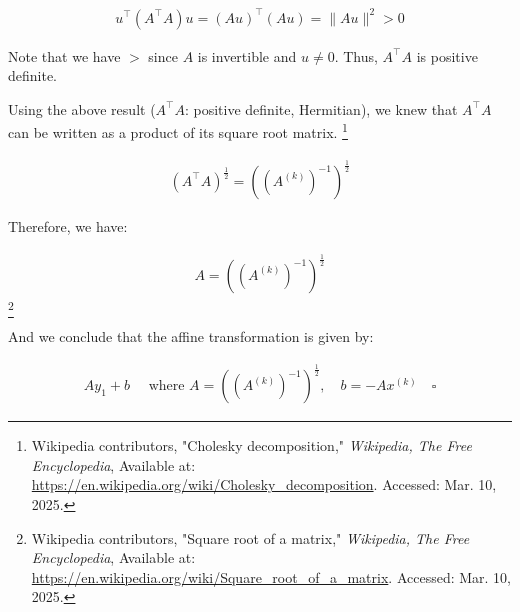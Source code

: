 \documentclass{article}
\begin{document}
\begin{align*}
    u^\intercal (A^\intercal A) u = (A u)^\intercal (A u)  = \|A u\|^2 > 0
\end{align*}

Note that we have $>$ since $A$ is invertible and $u \ne 0$.
Thus, $A^\intercal A$ is positive definite.
\bigskip

Using the above result ($A^\intercal A$: positive definite, Hermitian),
we knew that $A^\intercal A$ can be written as a product of its square root matrix.
\footnote{Wikipedia contributors, "Cholesky decomposition," \textit{Wikipedia, The Free Encyclopedia}, Available at: \url{https://en.wikipedia.org/wiki/Cholesky_decomposition}. Accessed: Mar. 10, 2025.}

\begin{align*}
    (A^\intercal A)^{\frac{1}{2}} = ((A^{(k)})^{-1})^{\frac{1}{2}}
\end{align*}

Therefore, we have:

\begin{align*}
    A = ((A^{(k)})^{-1})^{\frac{1}{2}}
\end{align*}
\footnote{Wikipedia contributors, "Square root of a matrix," \textit{Wikipedia, The Free Encyclopedia}, Available at: \url{https://en.wikipedia.org/wiki/Square_root_of_a_matrix}. Accessed: Mar. 10, 2025.}

And we conclude that the affine transformation is given by:

\begin{align*}
    A y_1 + b \quad \text{ where }
    A = ((A^{(k)})^{-1})^{\frac{1}{2}}, \quad b = -A x^{(k)} \quad \square
\end{align*}



\begin{comment}
\begin{align*}
    y_1 = A^{-1}(y_1' - b) 
\end{align*}

since $A$ is guaranteed to be invertible by the definition of affine transformation.
Plugging it into $(*)$, we have:

\begin{align*}
    &(A^{-1}(y_1' - b) - x^{(k)})^\intercal (A^{(k)})^{-1} (A^{-1}(y_1' - b) - x^{(k)}) \le 1 \\
    \Rightarrow \ & (A^{-1}y_1' - A^{-1}b - x^{(k)})^\intercal \textcolor{orange}{(A^{(k)})^{-1}} (A^{-1}y_1' - A^{-1}b - x^{(k)}) \le 1 \\
    \Rightarrow \ & \left[((y_1')^\intercal (A^{-1})^\intercal\textcolor{orange}{(A^{(k)})^{-1}} - b^\intercal(A^{-1})^\intercal\textcolor{orange}{(A^{(k)})^{-1}} - (x^{(k)})^\intercal\textcolor{orange}{(A^{(k)})^{-1}}) \right]
    (A^{-1}y_1' - A^{-1}b - x^{(k)}) \le 1 \\
\end{align*}
\end{comment}
\end{document}
